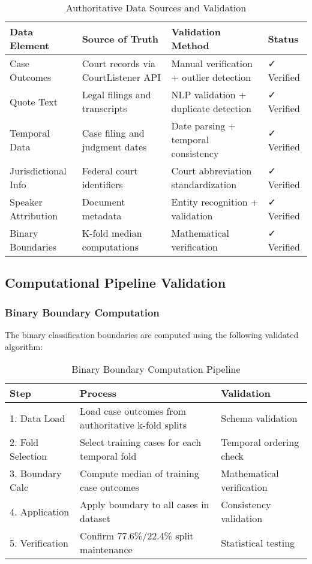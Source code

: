 \documentclass[11pt,a4paper]{article}
\begin{document}
\begin{table}[H]
\centering
\caption{Authoritative Data Sources and Validation}
\begin{tabular}{p{3cm}p{5cm}p{3cm}l}
\toprule
\textbf{Data Element} & \textbf{Source of Truth} & \textbf{Validation Method} & \textbf{Status} \\
\midrule
Case Outcomes & Court records via CourtListener API & Manual verification + outlier detection & ✓ Verified \\
Quote Text & Legal filings and transcripts & NLP validation + duplicate detection & ✓ Verified \\
Temporal Data & Case filing and judgment dates & Date parsing + temporal consistency & ✓ Verified \\
Jurisdictional Info & Federal court identifiers & Court abbreviation standardization & ✓ Verified \\
Speaker Attribution & Document metadata & Entity recognition + validation & ✓ Verified \\
Binary Boundaries & K-fold median computations & Mathematical verification & ✓ Verified \\
\bottomrule
\end{tabular}
\end{table}

\subsection{Computational Pipeline Validation}

\subsubsection{Binary Boundary Computation}
The binary classification boundaries are computed using the following validated algorithm:

\begin{table}[H]
\centering
\caption{Binary Boundary Computation Pipeline}
\begin{tabular}{p{2cm}p{6cm}p{3cm}}
\toprule
\textbf{Step} & \textbf{Process} & \textbf{Validation} \\
\midrule
1. Data Load & Load case outcomes from authoritative k-fold splits & Schema validation \\
2. Fold Selection & Select training cases for each temporal fold & Temporal ordering check \\
3. Boundary Calc & Compute median of training case outcomes & Mathematical verification \\
4. Application & Apply boundary to all cases in dataset & Consistency validation \\
5. Verification & Confirm 77.6\%/22.4\% split maintenance & Statistical testing \\
\bottomrule
\end{tabular}
\end{table}
\end{document}
